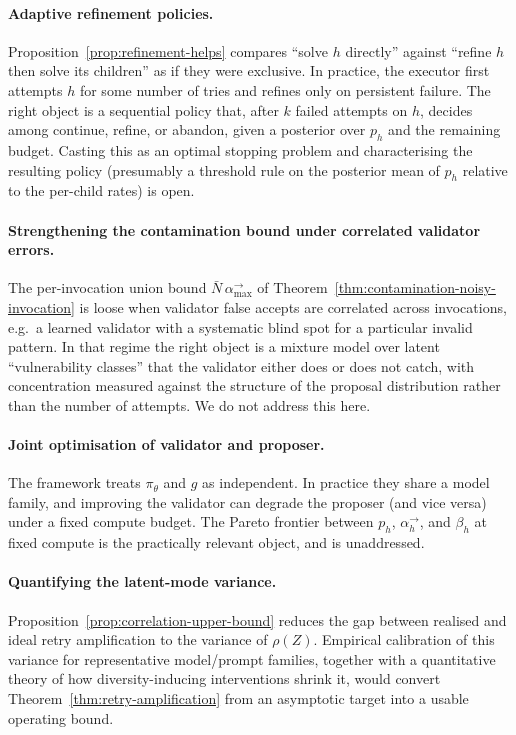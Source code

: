 \documentclass[11pt]{article}
\newcommand{\LLM}{\pi_\theta}
\begin{document}
\paragraph{Adaptive refinement policies.}
Proposition~\ref{prop:refinement-helps} compares ``solve $h$ directly'' against ``refine $h$ then solve
its children'' as if they were exclusive. In practice, the executor first
attempts $h$ for some number of tries and refines only on persistent failure.
The right object is a sequential policy that, after $k$ failed attempts on
$h$, decides among continue, refine, or abandon, given a posterior over
$p_h$ and the remaining budget. Casting this as an optimal stopping problem
and characterising the resulting policy (presumably a threshold rule on the
posterior mean of $p_h$ relative to the per-child rates) is open.

\paragraph{Strengthening the contamination bound under correlated validator
errors.} The per-invocation union bound
$\bar N\,\alpha_{\max}^{\rightarrow}$ of
Theorem~\ref{thm:contamination-noisy-invocation} is loose when validator false
accepts are correlated across invocations, e.g.\ a learned validator with a
systematic blind spot for a particular invalid pattern. In that regime the
right object is a mixture model over latent ``vulnerability classes'' that
the validator either does or does not catch, with concentration measured
against the structure of the proposal distribution rather than the number of
attempts. We do not address this here.

\paragraph{Joint optimisation of validator and proposer.}
The framework treats $\LLM$ and $g$ as independent. In practice they share a
model family, and improving the validator can degrade the proposer (and vice
versa) under a fixed compute budget. The Pareto frontier between
$p_h$, $\alpha_h^{\rightarrow}$, and $\beta_h$ at fixed compute is the
practically relevant object, and is unaddressed.

\paragraph{Quantifying the latent-mode variance.}
Proposition~\ref{prop:correlation-upper-bound} reduces the gap between
realised and ideal retry amplification to the variance of $\rho(Z)$. Empirical
calibration of this variance for representative model/prompt families,
together with a quantitative theory of how diversity-inducing interventions
shrink it, would convert Theorem~\ref{thm:retry-amplification} from an asymptotic target into a usable
operating bound.
\end{document}
